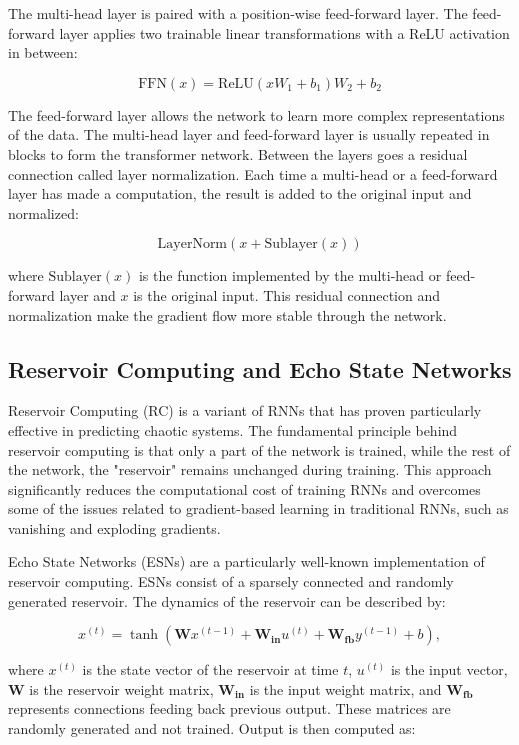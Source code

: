\documentclass[11pt]{article}
\begin{document}
The multi-head layer is paired with a position-wise feed-forward layer. The feed-forward layer applies two trainable linear transformations with a ReLU activation in between:

$$\text{FFN}(x) = \text{ReLU}(xW_1 + b_1)W_2 + b_2$$

The feed-forward layer allows the network to learn more complex representations of the data. The multi-head layer and feed-forward layer is usually repeated in blocks to form the transformer network. Between the layers goes a residual connection called layer normalization. Each time a multi-head or a feed-forward layer has made a computation, the result is added to the original input and normalized:

$$\text{LayerNorm}(x + \text{Sublayer}(x))$$

where $\text{Sublayer}(x)$ is the function implemented by the multi-head or feed-forward layer and $x$ is the original input. This residual connection and normalization make the gradient flow more stable through the network.

\subsection{Reservoir Computing and Echo State Networks}

Reservoir Computing (RC) is a variant of RNNs that has proven particularly effective in predicting chaotic systems. The fundamental principle behind reservoir computing is that only a part of the network is trained, while the rest of the network, the "reservoir" remains unchanged during training. This approach significantly reduces the computational cost of training RNNs and overcomes some of the issues related to gradient-based learning in traditional RNNs, such as vanishing and exploding gradients.

Echo State Networks (ESNs) are a particularly well-known implementation of reservoir computing. ESNs consist of a sparsely connected and randomly generated reservoir. The dynamics of the reservoir can be described by:

\begin{equation}
x^{(t)} = \tanh(\mathbf{W}x^{(t-1)} + \mathbf{W_{in}}u^{(t)} + \mathbf{W_{fb}}y^{(t-1)} + b),
\end{equation}

where $x^{(t)}$ is the state vector of the reservoir at time $t$, $u^{(t)}$ is the input vector, $\mathbf{W}$ is the reservoir weight matrix, $\mathbf{W_{in}}$ is the input weight matrix, and $\mathbf{W_{fb}}$ represents connections feeding back previous output. These matrices are randomly generated and not trained. Output is then computed as:
\end{document}
